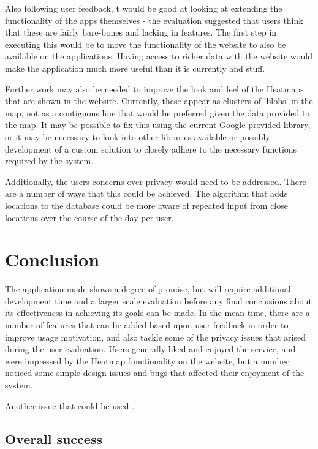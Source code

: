 \documentclass{l4proj}
\begin{document}
Also following user feedback, t would be good at looking at extending the functionality of the apps themselves - the evaluation suggested that users think that these are fairly bare-bones and lacking in features. The first step in executing this would be to move the functionality of the website to also be available on the applications. Having access to richer data with the website would make the application much more useful than it is currently and stuff.

Further work may also be needed to improve the look and feel of the Heatmaps that are shown in the website. Currently, these appear as clusters of 'blobs' in the map, not as a contiguous line that would be preferred given the data provided to the map. It may be possible to fix this using the current Google provided library, or it may be necessary to look into other libraries available or possibly development of a custom solution to closely adhere to the necessary functions required by the system.

Additionally, the users concerns over privacy would need to be addressed. There are a number of ways that this could be achieved. The algorithm that adds locations to the database could be more aware of repeated input from close locations over the course of the day per user.


\chapter{Conclusion}

The application made shows a degree of promise, but will require additional development time and a larger scale evaluation before any final conclusions about its effectiveness in achieving its goals can be made. In the mean time, there are a number of features that can be added based upon user feedback in order to improve usage motivation, and also tackle some of the privacy issues that arised during the user evaluation. Users generally liked and enjoyed the service, and were impressed by the Heatmap functionality on the website, but a number noticed some simple design issues and bugs that affected their enjoyment of the system.

Another issue that could be used . 

\section{Overall success}
\end{document}
